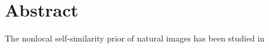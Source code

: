 %
\chapter*{Abstract}
\label{sec:abstract}
\vspace*{-10mm}

The nonlocal self-similarity prior of natural images has been studied in 



